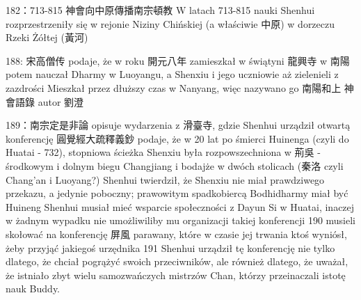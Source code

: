 182：713-815 神會向中原傳播南宗頓教
W latach 713-815 nauki Shenhui rozprzestrzeniły się w rejonie Niziny Chińskiej (a właściwie 中原) w dorzeczu Rzeki Żółtej (黃河)

188: 宋高僧传 podaje, że w roku 開元八年 zamieszkał w świątyni 龍興寺 w 南陽
potem nauczał Dharmy w Luoyangu, a Shenxiu i jego uczniowie aż zielenieli z zazdrości
Mieszkał przez dłuższy czas w Nanyang, więc nazywano go 南陽和上
神會語錄 autor 劉澄

189：南宗定是非論 opisuje wydarzenia z 滑臺寺, gdzie Shenhui urządził otwartą konferencję
圓覺經大疏釋義鈔 podaje, że w 20 lat po śmierci Huinenga (czyli do Huatai - 732), stopniowa ścieżka Shenxiu była rozpowszechniona w 荊吳 - środkowym i dolnym biegu Changjiang i bodajże w dwóch stolicach (秦洛 czyli Chang'an i Luoyang?)
Shenhui twierdził, że Shenxiu nie miał prawdziwego przekazu, a jedynie poboczny; prawowitym spadkobiercą Bodhidharmy miał być Huineng
Shenhui musiał mieć wsparcie społeczności z Dayun Si w Huatai, inaczej w żadnym wypadku nie umożliwiliby mu organizacji takiej konferencji
190 musieli skołować na konferencję 屏風 parawany, które w czasie jej trwania ktoś wyniósł, żeby przyjąć jakiegoś urzędnika
191 Shenhui urządził tę konferencję nie tylko dlatego, że chciał pogrążyć swoich przeciwników, ale również dlatego, że uważał, że istniało zbyt wielu samozwańczych mistrzów Chan, którzy przeinaczali istotę nauk Buddy.
\fi
